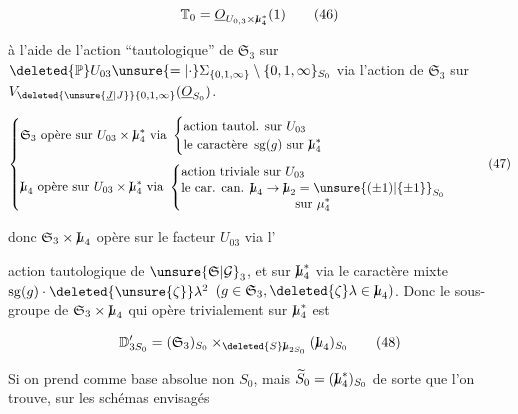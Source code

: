 \[
\mathbb T_0=\underline O_{U_{0,3}\times \mathord{\mathrm{I}\mkern-7mu\mu}_4^*}(1)
\tag*{(46)}
\]

à l'aide de l'action ``tautologique'' de $\mathfrak S_3$ sur $\deleted{\mathbb P}U_{03}\unsure{=|\cdot}\Sigma_{\{0,1,\infty\}}\setminus\{0,1,\infty\}_{S_0}$ via l'action de $\mathfrak S_3$ sur $V_{\deleted{\unsure{\underline J|J}}\{0,1,\infty\}}(\underline O_{S_0})$.

\[
\left\{\begin{aligned}
&\mathfrak S_3\ \text{opère sur } U_{03}\times \mathord{\mathrm{I}\mkern-7mu\mu}_4^*\ \text{via }
\begin{cases}
\text{action tautol. sur }U_{03}\\
\text{le caractère }\operatorname{sg}(g)\text{ sur }\mathord{\mathrm{I}\mkern-7mu\mu}_4^*
\end{cases}\\[2pt]
&\mathord{\mathrm{I}\mkern-7mu\mu}_4\ \text{opère sur }U_{03}\times \mathord{\mathrm{I}\mkern-7mu\mu}_4^*\ \text{via }
\begin{cases}
\text{action triviale sur }U_{03}\\
\begin{gathered}\text{le car. can. }\mathord{\mathrm{I}\mkern-7mu\mu}_4\to \mathord{\mathrm{I}\mkern-7mu\mu}_2=\unsure{(\pm1)|\{\pm1\}}_{S_0}\\
\text{sur }\mu_4^*\end{gathered}
\end{cases}
\end{aligned}\right.
\tag*{(47)}
\]

donc $\mathfrak S_3\times \mathord{\mathrm{I}\mkern-7mu\mu}_4$ opère sur le facteur $U_{03}$ via l'


action tautologique de $\unsure{\mathfrak S|\mathcal G}_3$, et sur $\mathord{\mathrm{I}\mkern-7mu\mu}_4^*$ via le caractère mixte $\operatorname{sg}(g)\cdot\deleted{\unsure{\zeta}}\lambda^2$ $(g\in \mathfrak S_3,\deleted{\zeta}\lambda\in \mathord{\mathrm{I}\mkern-7mu\mu}_4)$. Donc le sous-groupe de $\mathfrak S_3\times \mathord{\mathrm{I}\mkern-7mu\mu}_4$ qui opère trivialement sur $\mathord{\mathrm{I}\mkern-7mu\mu}_4^*$ est

\[
\mathbb D'_{3S_0}=(\mathfrak S_3)_{S_0}\times_{\deleted{S}\mathord{\mathrm{I}\mkern-7mu\mu}_{2S_0}}(\mathord{\mathrm{I}\mkern-7mu\mu}_4)_{S_0}
\tag*{(48)}
\]

Si on prend comme base absolue non $S_0$, mais $\widetilde S_0=(\mathord{\mathrm{I}\mkern-7mu\mu}_4^*)_{S_0}$ de sorte que l'on trouve, sur les schémas  envisagés

